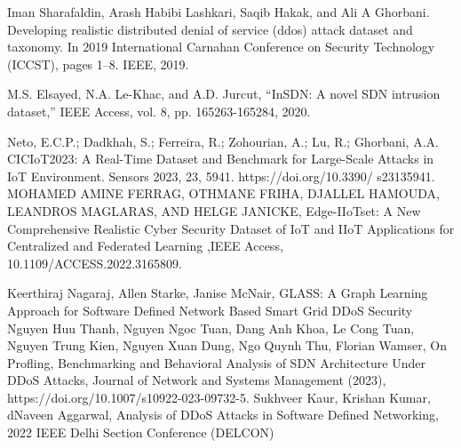 
\begin{thebibliography}{00}




 Iman Sharafaldin, Arash Habibi Lashkari, Saqib Hakak, and Ali A Ghorbani. Developing realistic distributed denial of service (ddos) attack dataset and taxonomy. In 2019 International Carnahan Conference on Security Technology (ICCST), pages 1–8. IEEE, 2019.


 M.S. Elsayed, N.A. Le-Khac, and A.D. Jurcut, “InSDN: A novel SDN intrusion dataset,” IEEE Access, vol. 8, pp. 165263-165284, 2020.







Neto, E.C.P.; Dadkhah, S.;
Ferreira, R.; Zohourian, A.; Lu, R.;
Ghorbani, A.A. CICIoT2023: A
Real-Time Dataset and Benchmark
for Large-Scale Attacks in IoT
Environment. Sensors 2023, 23, 5941.
https://doi.org/10.3390/
s23135941.
MOHAMED AMINE FERRAG, OTHMANE FRIHA, DJALLEL HAMOUDA, LEANDROS MAGLARAS, AND HELGE JANICKE, Edge-IIoTset: A New Comprehensive Realistic
Cyber Security Dataset of IoT and IIoT
Applications for Centralized and
Federated Learning ,IEEE Access, 10.1109/ACCESS.2022.3165809.

Keerthiraj Nagaraj, Allen Starke, Janise McNair, GLASS: A Graph Learning Approach for Software Defined Network Based Smart Grid DDoS Security
Nguyen Huu Thanh, Nguyen Ngoc Tuan, Dang Anh Khoa, Le Cong Tuan, Nguyen Trung Kien, Nguyen Xuan Dung, Ngo Quynh Thu, Florian Wamser, On Profling, Benchmarking and Behavioral Analysis of SDN 
Architecture Under DDoS Attacks, Journal of Network and Systems Management (2023), https://doi.org/10.1007/s10922-023-09732-5.
Sukhveer Kaur,  Krishan Kumar, dNaveen Aggarwal, Analysis of DDoS Attacks in Software Defined Networking, 2022 IEEE Delhi Section Conference (DELCON)


\end{thebibliography}
